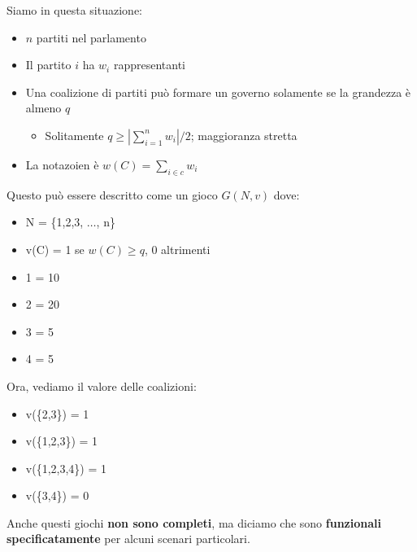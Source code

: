 Siamo in questa situazione:
\begin{itemize}
    \item $n$ partiti nel parlamento
    \item Il partito $i$ ha $w_i$ rappresentanti
    \item Una coalizione di partiti può formare un governo solamente se la grandezza è
          almeno $q$
          \begin{itemize}
              \item Solitamente $q \geq | \sum_{i=1}^n w_i|/2$; maggioranza stretta
          \end{itemize}
    \item La notazoien è $w(C) = \sum_{i \in c} w_i$
\end{itemize}

Questo può essere descritto come un gioco $G (N,v)$ dove:
\begin{itemize}
    \item N = \{1,2,3, $\dots$, n\}
    \item v(C) = 1 se $w(C) \geq q$, 0 altrimenti
\end{itemize}

\begin{esempio}
\end{esempio}

\begin{itemize}
    \item 1 = 10
    \item 2 = 20
    \item 3 = 5
    \item 4 = 5
\end{itemize}

Ora, vediamo il valore delle coalizioni:
\begin{itemize}
    \item v(\{2,3\}) = 1
    \item v(\{1,2,3\}) = 1
    \item v(\{1,2,3,4\}) = 1
    \item v(\{3,4\}) = 0
\end{itemize}

Anche questi giochi \textbf{non sono completi}, ma diciamo che sono
\textbf{funzionali specificatamente} per alcuni scenari particolari.

